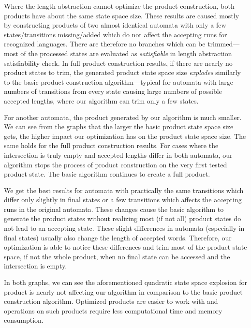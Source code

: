 Where the length abstraction cannot optimize the product construction, both products have about the same state space size. These results are caused mostly by constructing products of two almost identical automata with only a few states/transitions missing/added which do not affect the accepting runs for recognized languages. There are therefore no branches which can be trimmed---most of the processed states are evaluated as \emph{satisfiable} in length abstraction satisfiability check. In full product construction results, if there are nearly no product states to trim, the generated product state space size \emph{explodes} similarly to the basic product construction algorithm---typical for automata with large numbers of transitions from every state causing large numbers of possible accepted lengths, where our algorithm can trim only a few states.

For another automata, the product generated by our algorithm is much smaller. We can see from the graphs that the larger the basic product state space size gets, the higher impact our optimization has on the product state space size. The same holds for the full product construction results. For cases where the intersection is truly empty and accepted lengths differ in both automata, our algorithm stops the process of product construction on the very first tested product state. The basic algorithm continues to create a full product.

We get the best results for automata with practically the same transitions which differ only slightly in final states or a few transitions which affects the accepting runs in the original automata. These changes cause the basic algorithm to generate the product states without realizing most (if not all) product states do not lead to an accepting state. These slight differences in automata (especially in final states) usually also change the length of accepted words. Therefore, our optimization is able to notice these differences and trim most of the product state space, if not the whole product, when no final state can be accessed and the intersection is empty.

In both graphs, we can see the aforementioned quadratic state space explosion for product is nearly not affecting our algorithm in comparison to the basic product construction algorithm. Optimized products are easier to work with and operations on such products require less computational time and memory consumption.

